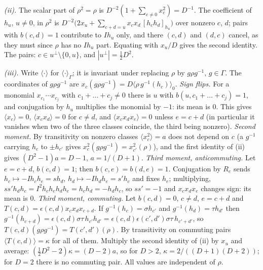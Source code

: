 \emph{(ii).} The scalar part of $\rho^{2} = \rho$ is $D^{-2}(1 + \sum_{c\ne0}x_{c}^{2}) = D^{-1}$. The coefficient of $h_{u}$, $u \ne 0$, in $\rho^{2}$ is $D^{-2}\bigl(2x_{u} + \sum_{c+d=u}x_{c}x_{d}\,[h_{c}h_{d}]_{h_{u}}\bigr)$ over nonzero $c$, $d$; pairs with $b(c,d) = 1$ contribute to $Ih_{u}$ only, and there $(c,d)$ and $(d,c)$ cancel, as they must since $\rho$ has no $Ih_{u}$ part. Equating with $x_{u}/D$ gives the second identity. The pairs: $c \in u^{\perp}\setminus\{0, u\}$, and $|u^{\perp}| = \tfrac12D^{2}$.

\emph{(iii).} Write $\langle\cdot\rangle$ for $\langle\cdot\rangle_{\Gamma}$; it is invariant under replacing $\rho$ by $g\rho g^{-1}$, $g \in \Gamma$. The coordinates of $g\rho g^{-1}$ are $x_{c}(g\rho g^{-1}) = D\langle\rho\,g^{-1}(h_{c})\rangle_{0}$. \emph{Sign flips.} For a monomial $x_{c_{1}}\cdots x_{c_{j}}$ with $c_{1} + \dots + c_{j} \ne 0$ there is $u$ with $b(u, c_{1} + \dots + c_{j}) = 1$, and conjugation by $h_{u}$ multiplies the monomial by $-1$: its mean is $0$. This gives $\langle x_{c}\rangle = 0$, $\langle x_{c}x_{d}\rangle = 0$ for $c \ne d$, and $\langle x_{c}x_{d}x_{e}\rangle = 0$ unless $e = c + d$ (in particular it vanishes when two of the three classes coincide, the third being nonzero). \emph{Second moment.} By transitivity on nonzero classes $\langle x_{c}^{2}\rangle = a$ does not depend on $c$ (a $g^{-1}$ carrying $h_{c}$ to $\pm h_{c'}$ gives $x_{c}^{2}(g\rho g^{-1}) = x_{c'}^{2}(\rho)$), and the first identity of (ii) gives $(D^{2} - 1)a = D - 1$, $a = 1/(D+1)$. \emph{Third moment, anticommuting.} Let $e = c + d$, $b(c,d) = 1$; then $b(c,e) = b(d,e) = 1$. Conjugation by $R_{e}$ sends $h_{c} \mapsto -Ih_{c}h_{e} = sh_{d}$, $h_{d} \mapsto -Ih_{d}h_{e} = s'h_{c}$ and fixes $h_{e}$; multiplying, $ss'h_{d}h_{c} = I^{2}h_{c}h_{e}h_{d}h_{e} = h_{c}h_{d} = -h_{d}h_{c}$, so $ss' = -1$ and $x_{c}x_{d}x_{e}$ changes sign: its mean is $0$. \emph{Third moment, commuting.} Let $b(c,d) = 0$, $c \ne d$, $e = c + d$ and $T(c,d) = \epsilon(c,d)x_{c}x_{d}x_{c+d}$. If $g^{-1}(h_{c}) = \sigma h_{c'}$ and $g^{-1}(h_{d}) = \tau h_{d'}$ then $g^{-1}(h_{c+d}) = \epsilon(c,d)\sigma\tau\,h_{c'}h_{d'} = \epsilon(c,d)\epsilon(c',d')\sigma\tau\,h_{c'+d'}$, so $T(c,d)(g\rho g^{-1}) = T(c',d')(\rho)$. By transitivity on commuting pairs $\langle T(c,d)\rangle = \kappa$ for all of them. Multiply the second identity of (ii) by $x_{u}$ and average: $(\tfrac12D^{2} - 2)\kappa = (D - 2)a$, so for $D > 2$, $\kappa = 2/((D+1)(D+2))$; for $D = 2$ there is no commuting pair. All values are independent of $\rho$.

